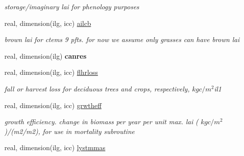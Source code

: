 \begin{DoxyCompactItemize}
\begin{DoxyCompactList}\small\item\em storage/imaginary lai for phenology purposes \end{DoxyCompactList}\item 
\hypertarget{structctem__statevars_1_1veg__gat_af9cc726ba6ddbcd058652f920d885d11}{}real, dimension(ilg, icc) \hyperlink{structctem__statevars_1_1veg__gat_af9cc726ba6ddbcd058652f920d885d11}{ailcb}\label{structctem__statevars_1_1veg__gat_af9cc726ba6ddbcd058652f920d885d11}

\begin{DoxyCompactList}\small\item\em brown lai for ctem\textquotesingle{}s 9 pfts. for now we assume only grasses can have brown lai \end{DoxyCompactList}\item 
\hypertarget{structctem__statevars_1_1veg__gat_a55a5254937dad889c6f04011f8075ada}{}real, dimension(ilg) {\bfseries canres}\label{structctem__statevars_1_1veg__gat_a55a5254937dad889c6f04011f8075ada}

\item 
\hypertarget{structctem__statevars_1_1veg__gat_a334bf76042f09d71780dfc71f3ae15c2}{}real, dimension(ilg, icc) \hyperlink{structctem__statevars_1_1veg__gat_a334bf76042f09d71780dfc71f3ae15c2}{flhrloss}\label{structctem__statevars_1_1veg__gat_a334bf76042f09d71780dfc71f3ae15c2}

\begin{DoxyCompactList}\small\item\em fall or harvest loss for deciduous trees and crops, respectively, $kg c/m^2$il1 \end{DoxyCompactList}\item 
\hypertarget{structctem__statevars_1_1veg__gat_afad20b5903ad8da7c1bbf4ff48f7ac94}{}real, dimension(ilg, icc) \hyperlink{structctem__statevars_1_1veg__gat_afad20b5903ad8da7c1bbf4ff48f7ac94}{grwtheff}\label{structctem__statevars_1_1veg__gat_afad20b5903ad8da7c1bbf4ff48f7ac94}

\begin{DoxyCompactList}\small\item\em growth efficiency. change in biomass per year per unit max. lai ( $kg c/m^2$)/(m2/m2), for use in mortality subroutine \end{DoxyCompactList}\item 
\hypertarget{structctem__statevars_1_1veg__gat_a227a404848654035f3a59bed13e9c494}{}real, dimension(ilg, icc) \hyperlink{structctem__statevars_1_1veg__gat_a227a404848654035f3a59bed13e9c494}{lystmmas}\label{structctem__statevars_1_1veg__gat_a227a404848654035f3a59bed13e9c494}


\end{DoxyCompactItemize}
